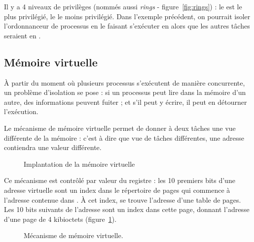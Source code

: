 Il y a 4 niveaux de privilèges (nommés aussi \emph{rings} -
figure~\ref{fig:rings}) : le  est le plus privilégié, le  le
moins privilégié. Dans l'exemple précédent, on pourrait isoler l'ordonnanceur de
processus en le faisant s'exécuter en  alors que les autres tâches
seraient en .

\subsection{Mémoire virtuelle}

À partir du moment où plusieurs processus s'exécutent de manière concurrente, un
problème d'isolation se pose : si un processus peut lire dans la mémoire d'un
autre, des informations peuvent fuiter ; et s'il peut y écrire, il peut en
détourner l'exécution.

Le mécanisme de mémoire virtuelle permet de donner à deux tâches une vue
différente de la mémoire : c'est à dire que vue de tâches différentes, une
adresse contiendra une valeur différente.

\begin{figure}

\caption{Implantation de la mémoire virtuelle}
\label{fig:pagetables}
\end{figure}

Ce mécanisme est contrôlé par valeur du registre \crtrois : les 10 premiers bits
d'une adresse virtuelle sont un index dans le répertoire de pages qui commence à
l'adresse contenue dans \crtrois. À cet index, se trouve l'adresse d'une table
de pages. Les 10 bits suivants de l'adresse sont un index dans cette page,
donnant l'adresse d'une page de 4 kibioctets (figure~\ref{fig:pagetables}).

\begin{figure} %
\centering
{}
\caption{Mécanisme de mémoire virtuelle.}
\label{fig:memoire-virtuelle}
\end{figure} %


